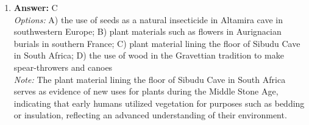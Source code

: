 \documentclass[12pt]{article}
\begin{document}
\begin{enumerate}[label=\arabic*.]
\item \textbf{Answer:} C
\\ \textit{Options:} A) the use of seeds as a natural insecticide in Altamira cave in southwestern Europe; B) plant materials such as flowers in Aurignacian burials in southern France; C) plant material lining the floor of Sibudu Cave in South Africa; D) the use of wood in the Gravettian tradition to make spear-throwers and canoes
\\ \textit{Note:} The plant material lining the floor of Sibudu Cave in South Africa serves as evidence of new uses for plants during the Middle Stone Age, indicating that early humans utilized vegetation for purposes such as bedding or insulation, reflecting an advanced understanding of their environment.
\end{enumerate}
\end{document}

